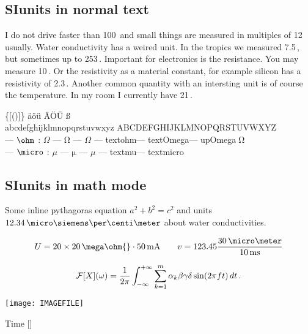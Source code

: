 \subsection{SIunits in normal text}

I do not drive faster than 100\,\kilo\meter\per\hour{} and small
things are measured in multiples of 12\,\micro\meter{} usually. Water
conductivity has a weired unit. In the tropics we measured
7.5\,\micro\siemens\per\centi\meter, but sometimes up to
253\,\micro\siemens\per\centi\meter. Important for electronics is the
resistance. You may measure 10\,\kilo\ohm. Or the resistivity as a
material constant, for example silicon has a resistivity of
2.3\,\kilo\ohm\meter. Another common quantity with an intersting unit
is of course the temperature. In my room I currently have
21\,\celsius.

\bigskip
{} \qquad \{[()]\} \qquad \"a\"o\"u  \"A\"O\"U {\ss} \\
abcdefghijklmnopqrstuvwxyz \qquad ABCDEFGHIJKLMNOPQRSTUVWXYZ \\
\ohm{} --- $\ohm$ : $\Omega$ --- $\mathrm{\Omega}$ --- $\mathsf{\Omega}$ ---
\ifcsname textohm\endcsname\textohm\fi  --- \ifcsname textOmega\endcsname\textOmega\fi ---
\ifcsname upOmega\endcsname$\upOmega$\fi \\
\micro{} --- $\micro$ : $\mu$ --- $\mathrm{\mu}$ --- $\mathsf{\mu}$ ---
\ifcsname textmu\endcsname\textmu\fi --- \ifcsname textmicro\endcsname\textmicro\fi

\subsection{SIunits in math mode}

Some inline pythagoras equation $a^2 + b^2 = c^2$ and units
$12.34\,\micro\siemens\per\centi\meter$ about water
conductivities.

\[ U = 20 \times 20\,\mega\ohm{}\cdot 50\,\text{mA} \qquad
   v = 123.45 \frac{30\,\micro\meter}{10\,\text{ms}} \]

\[ {\cal F}[X](\omega) = \frac{1}{2\pi}\int_{-\infty}^{+\infty} \sum_{k=1}^m \alpha_k\beta\gamma\delta\sin(2\pi f t)\,dt\,. \]

\noindent
\texttt{[image: IMAGEFILE]}
\centerline{Time [\micro\second]}
